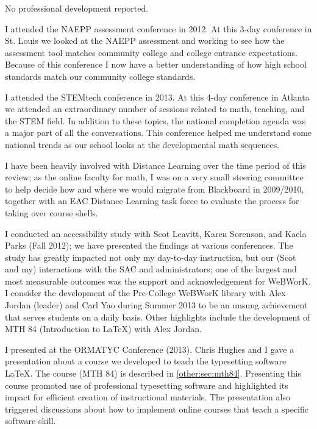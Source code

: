 \begin{description}[style=nextline]
	\item[Dave Hall (Full-time Instructor, Rock Creek Campus)]
	No professional development reported.
	\item[Shane Horner (Full-Time instructor, Cascade campus)]
	I attended the NAEPP assessment conference in 2012.  At this 3-day conference
	in St. Louis we looked at the NAEPP assessment and working to see how the
	assessment tool matches community college and college entrance expectations.
	Because of this conference I now have a better understanding of how high school
	standards match our community college standards.

	I attended the STEMtech conference in 2013.  At this 4-day conference in
	Atlanta we attended an extraordinary number of sessions related to math,
	teaching, and the STEM field.  In addition to these topics, the national
	completion agenda was a major part of all the conversations.  This conference
	helped me understand some national trends as our school looks at the
	developmental math sequences.

	\item[Chris Hughes (Full-time faculty, Cascade)]
	I have been heavily involved with Distance Learning over the time period of
	this review; as the online faculty for math, I was on a very small steering
	committee to help decide how and where we would migrate from Blackboard in
	2009/2010, together with an EAC Distance Learning task force to evaluate the
	process for taking over course shells.

	I conducted an accessibility study with Scot Leavitt, Karen Sorenson, and Kaela
	Parks (Fall 2012); we have presented the findings at various conferences. The
	study has greatly impacted not only my day-to-day instruction, but our (Scot
	and my) interactions with the SAC and administrators; one of the largest and
	most measurable outcomes was the support and acknowledgement for WeBWorK. I
	consider the development of the Pre-College WeBWorK library with Alex Jordan (leader)
	and Carl Yao during Summer 2013 to be an unsung achievement that serves
	students on a daily basis. Other highlights include the development of MTH 84 (Introduction to
	\LaTeX) with Alex Jordan.

	\item[Alex Jordan (Full-time Instructor, Sylvania Campus)]
	I presented at the ORMATYC Conference (2013).  Chris Hughes and I gave a
	presentation about a course we developed to teach the typesetting software
	\LaTeX.  The course (MTH 84) is described in \vref{other:sec:mth84}. Presenting
	this course promoted use of professional typesetting software and highlighted
	its impact for efficient creation of instructional materials. The presentation
	also triggered discussions about how to implement online courses that teach a
	specific software skill.


\end{description}
